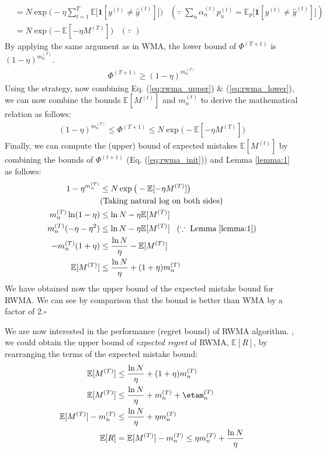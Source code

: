 \documentclass[11pt]{article}
\newcommand*{\QED}{\hfill\ensuremath{\square}}
\begin{document}
{\begin{align}
    &=N\exp{\Big(-\eta\sum_{t=1}^{T}\mathbb{E}\big[\textbf{1}[y^{(t)}\neq\hat{y}^{(t)}]\big]\Big)}\;\;\;(\because\;\sum_n\alpha_n^{(t)}p_n^{(t)}=\mathbb{E}_p\big[\textbf{1}[y^{(t)}\neq\hat{y}^{(t)}]\big])\nonumber\\
    &=N\exp{\big(-\mathbb{E}[-\eta M^{(T)}]\big)}\;\;\;(\because\;)\label{eq:rwma_upper}
\end{align}
By applying the same argument as in WMA, the lower bound of $\Phi^{(T+1)}$ is $(1-\eta)^{m_n^{(T)}}$.
\begin{align}
    \Phi^{(T+1)}\geq(1-\eta)^{m_n^{(T)}}\label{eq:rwma_lower}
\end{align}
Using the strategy, now combining Eq. (\ref{eq:rwma_upper}) \& (\ref{eq:rwma_lower}), we can now combine the bounds $\mathbb{E}[M^{(t)}]$ and $m_n^{(t)}$ to derive the mathematical relation as follows:
\begin{align}
    (1-\eta)^{m_n^{(T)}}\leq \Phi^{(T+1)} \leq N\exp{\big(-\mathbb{E}[-\eta M^{(T)}]\big)}\label{eq:rwma_init}
\end{align}
Finally, we can compute the (upper) bound of expected mistakes $\mathbb{E}[M^{(t)}]$ by combining the bounds of $\Phi^{(t+1)}$ (Eq. (\ref{eq:rwma_init})) and Lemma \ref{lemma:1} as follows:
\begin{align*}
    {1-\eta}^{m_n^{(T)}} &\leq N\exp{\big(-\mathbb{E}[-\eta M^{(T)}]\big)}\\
    &\text{(Taking natural log on both sides)} \\
    m_n^{(T)}\ln(1-\eta) &\leq \ln N - \eta\mathbb{E}[M^{(T)}]\\
    m_n^{(T)}(-\eta-\eta^2)&\leq \ln N - \eta\mathbb{E}[M^{(T)}] \;\;\;(\because\; \text{Lemma}\;\ref{lemma:1})\\
    -m_n^{(T)}(1+\eta)&\leq\frac{\ln N}{\eta} - \mathbb{E}[M^{(T)}]\\
    \mathbb{E}[M^{(T)}]&\leq \frac{\ln N}{\eta} +  (1+\eta)m_n^{(T)}
\end{align*}
We have obtained now the upper bound of the expected mistake bound for RWMA. We can see by comparison that the bound is better than WMA by a factor of 2.\QED
}

We are now interested in the performance (regret bound) of RWMA algorithm.
, we could obtain the upper bound of \textit{expected regret} of RWMA, $\mathbb{E}[R]$, by rearranging the terms of the expected mistake bound:
\begin{align}
    \mathbb{E}[M^{(T)}]&\leq \frac{\ln N}{\eta} +  (1+\eta)m_n^{(T)} \\
    \mathbb{E}[M^{(T)}]&\leq \frac{\ln N}{\eta} +  m_n^{(T)}+\etam_n^{(T)} \\
    \mathbb{E}[M^{(T)}] - m_n^{(T)}&\leq \frac{\ln N}{\eta} +\eta m_n^{(T)} \\
    \mathbb{E}[R] &= \mathbb{E}[M^{(T)}] - m_n^{(T)} \leq \eta m_n^{(T)} + \frac{\ln N}{\eta} \label{eq:rwma_final}
\end{align}
\end{document}
